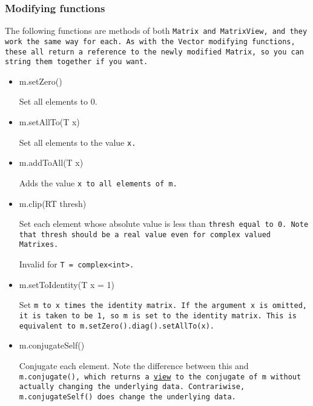 \subsubsection{Modifying functions}

The following functions are methods of both \tt{Matrix} and \tt{MatrixView},
and they work the same way for each.
As with the \tt{Vector} modifying functions, these all return a reference
to the newly modified \tt{Matrix}, so you can string them together if you want.

\begin{itemize}

\item
\begin{tmvcode}
m.setZero()
\end{tmvcode}
Set all elements to 0.

\item
\begin{tmvcode}
m.setAllTo(T x)
\end{tmvcode}
Set all elements to the value \tt{x}.

\item
\begin{tmvcode}
m.addToAll(T x)
\end{tmvcode}
Adds the value \tt{x} to all elements of \tt{m}.

\item
\begin{tmvcode}
m.clip(RT thresh)
\end{tmvcode}
Set each element whose absolute value is less than \tt{thresh} equal to 0.
Note that \tt{thresh} should be a real value even for complex valued
\tt{Matrix}es.  

Invalid for \tt{T = complex<int>}.

\item
\begin{tmvcode}
m.setToIdentity(T x = 1)
\end{tmvcode}
Set \tt{m} to \tt{x} times the identity matrix.
If the argument \tt{x} is omitted, it is 
taken to be \tt{1}, so \tt{m} is set to the identity matrix.
This is equivalent to \tt{m.setZero().diag().setAllTo(x)}.

\item 
\begin{tmvcode}
m.conjugateSelf()
\end{tmvcode}
Conjugate each element.  Note the difference between this and \tt{m.conjugate()}, 
which returns a \underline{view} to the conjugate of \tt{m} without
actually changing the underlying data.  Contrariwise, \tt{m.conjugateSelf()}
does change the underlying data.


\end{itemize}
